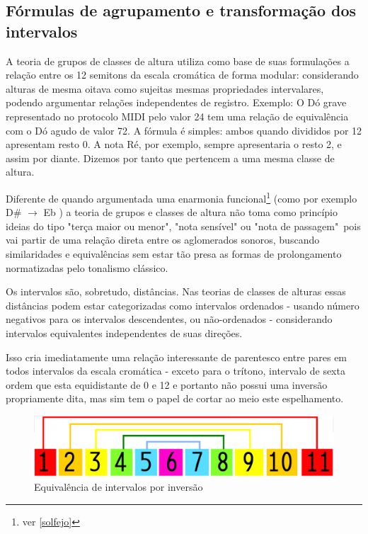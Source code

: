 \documentclass[
	12pt,				%
	openright,			%
	twoside,			%
	a4paper,			%
	english,			%
	french,				%
	spanish,			%
	brazil				%
	]{abntex2}
\begin{document}

\begin{apendicesenv}

\partapendices

\chapter{Fórmulas de agrupamento e transformação dos intervalos}

A teoria de grupos de classes de altura utiliza como base de suas formulações a relação entre os 12 semitons da escala cromática de forma modular: considerando alturas de mesma oitava como sujeitas mesmas propriedades intervalares, podendo argumentar relações independentes de registro. Exemplo: O Dó grave representado no protocolo MIDI pelo valor 24 tem uma relação de equivalência com o Dó agudo de valor 72. A fórmula é simples: ambos quando divididos por 12 apresentam resto 0. A nota Ré, por exemplo, sempre apresentaria o resto 2, e assim por diante. Dizemos por tanto que pertencem a uma mesma classe de altura.

Diferente de quando argumentada uma enarmonia funcional\footnote{ver \autoref{solfejo} } (como por exemplo D\# $\to$ Eb ) a teoria de grupos e classes de altura não toma como princípio ideias do tipo "terça maior ou menor", "nota sensível" ou "nota de passagem"\ pois vai partir de uma relação direta entre os aglomerados sonoros, buscando similaridades e equivalências sem estar tão presa as formas de prolongamento normatizadas pelo tonalismo clássico. \cite{lerdahl1989atonal,straus1987problem}

Os intervalos são, sobretudo, distâncias. Nas teorias de classes de alturas essas distâncias podem estar categorizadas como intervalos ordenados - usando número negativos para os intervalos descendentes, ou não-ordenados - considerando intervalos equivalentes independentes de suas direções.\cite[p. 6]{straus2004}

Isso cria imediatamente uma relação interessante de parentesco entre pares em todos intervalos da escala cromática - exceto para o trítono, intervalo de sexta ordem que esta equidistante de 0 e 12 e portanto não possui uma inversão propriamente dita, mas sim tem o papel de cortar ao meio este espelhamento.

\begin{figure}[!h]
	\caption{\label{fig_grafico}Equivalência de intervalos por inversão }
	\begin{center}
	    \includegraphics[scale=0.3]{algo/equivalencia_inversa.png}
	\end{center}
\end{figure}



\end{apendicesenv}
\end{document}
